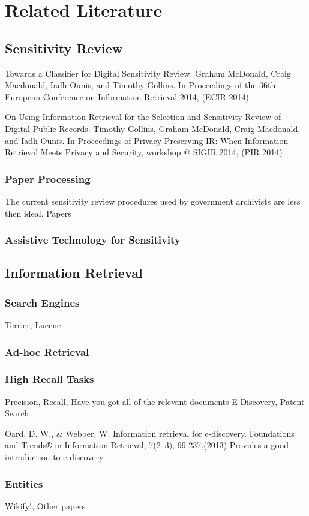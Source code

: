 \documentclass{l4proj}
\begin{document}
\chapter{Related Literature}
\section{Sensitivity Review}
Towards a Classifier for Digital Sensitivity Review. Graham McDonald, Craig Macdonald, Iadh Ounis, and Timothy Gollins. In Proceedings of the 36th European Conference on Information Retrieval 2014, (ECIR 2014)

On Using Information Retrieval for the Selection and Sensitivity Review of Digital Public Records. Timothy Gollins, Graham McDonald, Craig Macdonald, and Iadh Ounis. In Proceedings of Privacy-Preserving IR: When Information Retrieval Meets Privacy and Security, workshop @ SIGIR 2014, (PIR 2014)
\subsection{Paper Processing}
The current sensitivity review procedures used by government archivists are less then ideal. Papers
\subsection{Assistive Technology for Sensitivity}

\section{Information Retrieval}
\subsection{Search Engines}
Terrier, Lucene
\subsection{Ad-hoc Retrieval}
\subsection{High Recall Tasks}
Precision, Recall, Have you got all of the relevant documents
E-Discovery, Patent Search

Oard, D. W., \& Webber, W. Information retrieval for e-discovery. Foundations and Trends® in Information Retrieval, 7(2–3), 99-237.(2013)
Provides a good introduction to e-discovery
\subsection{Entities}
Wikify!, Other papers
\end{document}
